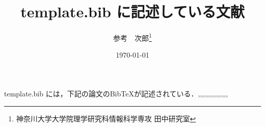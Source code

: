 \documentclass[10pt,twocolumn]{jarticle}
\title{template.bib に記述している文献}
\author{参考　次郎\if0\thanks{神奈川大学大学院理学研究科情報科学専攻 田中研究室}\fi}
\date{\today}
\begin{document}
\maketitle
\thispagestyle{empty}

%
%
%
%
%
%

% 

template.bib には，下記の論文のBibTeXが記述されている．\cite{survey_Taylor_2005},\cite{hicuts19},\cite{rbt},\cite{yuto},\cite{hypercuts},\cite{2014RbtHARADA},\cite{conf/infocom/HamedEA06},\cite{hikin},\cite{hicuts20},\cite{quad-trie},\cite{siftsearch},\cite{Taylor_ClassBench},\cite{takeyama},\cite{sgm},\cite{grouper-conf},\cite{pagiamtzis-jssc:2006}



\end{document}
